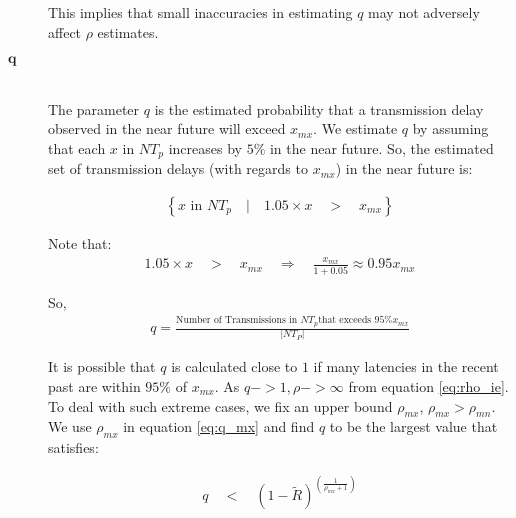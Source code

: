 \begin{description}
        This implies that small inaccuracies in estimating $q$ may not adversely affect $\rho$ estimates.  

        \item[\Huge$\boldsymbol{q}$] \hfill \\
                The parameter $q$ is the estimated probability that a transmission delay observed in the near future will exceed $x_{mx}$.  We estimate $q$ by assuming that each $x$ in $NT_p$ increases by $5\%$ in the near future.  So, the estimated set of transmission delays (with regards to $x_{mx}$) in the near future is:
                
        \begin{equation*}
            \begin{aligned}
                \left\{ x \text{ in } NT_p \quad  | \quad 1.05 \times x \quad > \quad x_{mx} \right\}
            \end{aligned}
        \end{equation*}
                
        Note that:
         \begin{equation*}
            \begin{aligned}
                1.05 \times x \quad > \quad x_{mx} \quad \Rightarrow \quad \frac{x_{mx}}{1 + 0.05 } \approx 0.95 x_{mx}
            \end{aligned}
        \end{equation*}
                
        So,
            \begin{equation*}
            \begin{aligned}
                q  = \frac{\text{Number of Transmissions in } NT_p \text{that exceeds } 95\% x_{mx}}{|NT_P|}
            \end{aligned}
        \end{equation*}
        
                It is possible that $q$ is calculated close to $1$ if many latencies in the recent past are within $95\%$ of $x_{mx}$.  As $q -> 1, \rho -> \infty$ from equation \ref{eq:rho_ie}.  To deal with such extreme cases, we fix an upper bound $\rho_{mx}$, $\rho_{mx} > \rho_{mn}$.  We use $\rho_{mx}$ in equation \ref{eq:q_mx} and find $q$ to be the largest value that satisfies:
                
       \begin{equation*}
            \begin{aligned}
                q \quad < \quad \left(1 - \tilde{R}\right)^{\left(\frac{1}{\rho_{mx} + 1} \right)}
            \end{aligned}
        \end{equation*}


\end{description}
